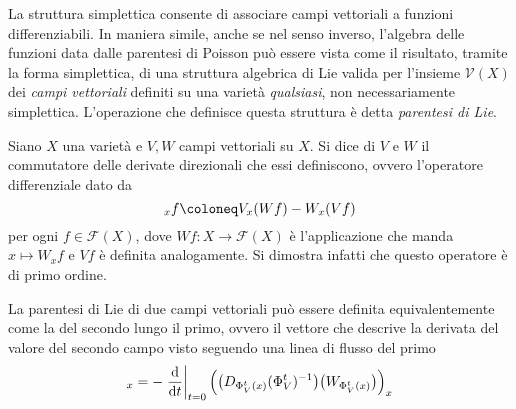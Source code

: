 La struttura simplettica consente di associare campi vettoriali a funzioni differenziabili. In maniera simile, anche se nel senso inverso, l'algebra delle funzioni data dalle parentesi di Poisson può essere vista come il risultato, tramite la forma simplettica, di una struttura algebrica di Lie valida per l'insieme $\mathcal{V}(X)$ dei \emph{campi vettoriali} definiti su una varietà \emph{qualsiasi}, non necessariamente simplettica. L'operazione che definisce questa struttura è detta \emph{parentesi di Lie}.
\begin{definition}
  Siano $X$ una varietà e $V,W$ campi vettoriali su $X$. Si dice  di $V$ e $W$ il commutatore delle derivate direzionali che essi definiscono, ovvero l'operatore differenziale dato da
  \begin{equation}
  [V,W]_x f\defeq V_x (W f) - W_x (V f)
  \end{equation}
  per ogni $f \in \mathcal{F}(X)$, dove $Wf: X \to \mathcal{F}(X)$ è l'applicazione che manda $x \mapsto W_x f$ e $Vf$ è definita analogamente. Si dimostra infatti che questo operatore è di primo ordine.
\end{definition}
\begin{remark}
  La parentesi di Lie di due campi vettoriali può essere definita equivalentemente come la  del secondo lungo il primo, ovvero il vettore che descrive la derivata del valore del secondo campo visto seguendo una linea di flusso del primo
  \begin{equation}
    [V,W]_x = - \eval{\dv{t}}_{t=0} \Big(\big(D_{\Phi_V^t(x)} (\Phi_V^t)^{-1}\big)\big(W_{\Phi_V^t(x)}\big) \Big)_x
    \end{equation}
\end{remark}
